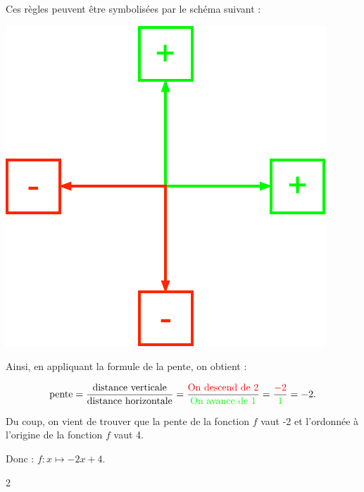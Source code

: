 \documentclass[a4paper,11pt]{report}
\begin{document}
{Ces règles peuvent être symbolisées par le schéma suivant : 

\begin{center}
\includegraphics[scale=.75]{media/FA-30/fleches.pdf}
\end{center}

Ainsi, en appliquant la formule de la pente, on obtient :

$$\mbox{pente} = \dfrac{\mbox{distance verticale}}{\mbox{distance horizontale}} = \dfrac{\mbox{\color{red}On descend de 2}}{\mbox{\color{green}On avance de 1}} = \dfrac{\color{red}-2}{\color{green}1}=-2. $$

Du coup, on vient de trouver que la pente de la fonction $f$ vaut -2 et l'ordonnée à l'origine de la fonction $f$ vaut 4.

Donc : $f : x \mapsto -2x+4.$
}{2}
\end{document}
